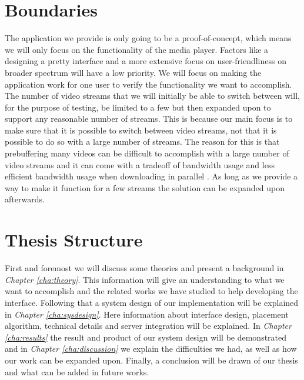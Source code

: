 \section{Boundaries}
\label{sec:boundaries}

The application we provide is only going to be a proof-of-concept, which means we will only focus on the functionality of the media player. Factors like a designing a pretty interface and a more extensive focus on user-friendliness on broader spectrum will have a low priority. We will focus on making the application work for one user to verify the functionality we want to accomplish. The number of video streams that we will initially be able to switch between will, for the purpose of testing, be limited to a few but then expanded upon to support any reasonable number of streams. This is because our main focus is to make sure that it is possible to switch between video streams, not that it is possible to do so with a large number of streams. The reason for this is that prebuffering many videos can be difficult to accomplish with a large number of video streams and it can come with a tradeoff of bandwidth usage and less efficient bandwidth usage when downloading in parallel \cite{watchingprefetching, scalableOnDemand}. As long as we provide a way to make it function for a few streams the solution can be expanded upon afterwards.

\section{Thesis Structure}
First and foremost we will discuss some theories and present a background in \textit{Chapter \ref{cha:theory}}. This information will give an understanding to what we want to accomplish and the related works we have studied to help developing the interface. Following that a system design of our implementation will be explained in \textit{Chapter \ref{cha:sysdesign}}. Here information about interface design, placement algorithm, technical details and server integration will be explained. In \textit{Chapter \ref{cha:results}} the result and product of our system design will be demonstrated and in \textit{Chapter \ref{cha:discussion}} we explain the difficulties we had, as well as how our work can be expanded upon. Finally, a conclusion will be drawn of our thesis and what can be added in future works.
